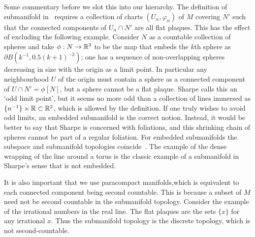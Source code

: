 Some commentary before we slot this into our hierarchy.
The definition of submanifold in~\cite{Sharpe1997} requires a collection of charts $(U_\alpha, \varphi_\alpha)$ of $M$ covering $\overline{N'}$ such that the connected components of $U_\alpha \cap N'$ are all flat plaques.
This has the effect of excluding the following example.
Consider $N$ as a countable collection of spheres and take $\phi : N \to \mathbb{R}^3$ to be the map that embeds the $k$th sphere as $\partial B(k^{-1}, 0.5(k+1)^{-2})$; one has a sequence of non-overlapping spheres decreasing in size with the origin as a limit point.
In particular any neighbourhood $U$ of the origin must contain a sphere as a connected component of $U \cap N' = \phi[N]$, but a sphere cannot be a flat plaque.
Sharpe calls this an `odd limit point', but it seems no more odd than a collection of lines immersed as $\{n^{-1}\} \times \mathbb{R} \subset \mathbb{R}^2$, which is allowed by the definition.
If one truly wishes to avoid odd limits, an embedded submanifold is the correct notion.
Instead, it would be better to say that Sharpe is concerned with foliations, and this shrinking chain of spheres cannot be part of a regular foliation.
For embedded submanifolds the subspace and submanifold topologies coincide~\cite[Prop~1.2.9]{Sharpe1997}.
The example of the dense wrapping of the line around a torus is the classic example of a submanifold in Sharpe's sense that is not embedded.

It is also important that we use paracompact manifolds,which is equivalent to each connected component being second countable.
This is because a subset of $M$ need not be second countable in the submanifold topology.
Consider the example of the irrational numbers in the real line.
The flat plaques are the sets $\{x\}$ for any irrational $x$.
Thus the submanifold topology is the discrete topology, which is not second-countable.

